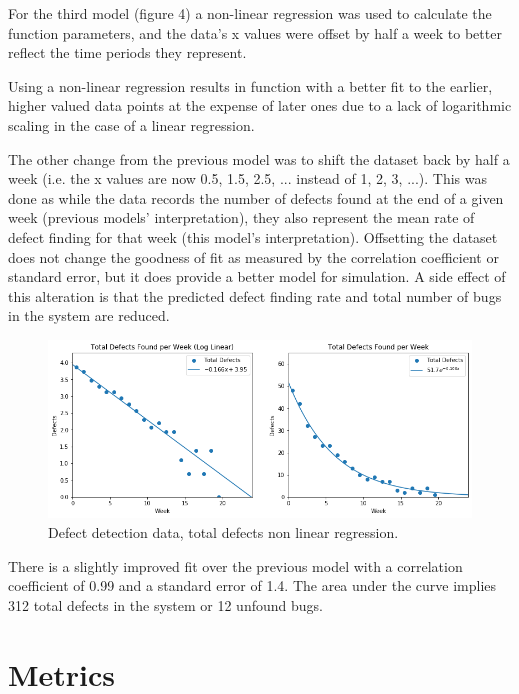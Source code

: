 \documentclass[12pt,a4paper]{article}
\begin{document}
		For the third model (figure 4) a non-linear regression was used to calculate the function parameters, and the data's x values were offset by half a week to better reflect the time periods they represent.
		
		Using a non-linear regression results in function with a better fit to the earlier, higher valued data points at the expense of later ones due to a lack of logarithmic scaling in the case of a linear regression.
		
		The other change from the previous model was to shift the dataset back by half a week (i.e. the x values are now 0.5, 1.5, 2.5, ... instead of 1, 2, 3, ...). This was done as while the data records the number of defects found at the end of a given week (previous models' interpretation), they also represent the mean rate of defect finding for that week (this model's interpretation). Offsetting the dataset does not change the goodness of fit as measured by the correlation coefficient or standard error, but it does provide a better model for simulation. A side effect of this alteration is that the predicted defect finding rate and total number of bugs in the system are reduced.
		
		\begin{figure}[hh]
			\centering
			\includegraphics[scale=0.6]{total_nlr}
			\caption{Defect detection data, total defects non linear regression.}
		\end{figure}
	
		There is a slightly improved fit over the previous model with a correlation coefficient of 0.99 and a standard error of 1.4. The area under the curve implies 312 total defects in the system or 12 unfound bugs.
		
	\section{Metrics}
		
\end{document}
